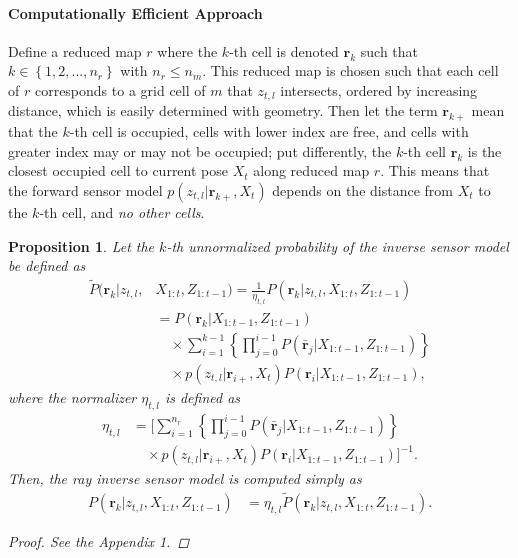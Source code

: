 \documentclass[letterpaper, 10pt, conference]{ieeeconf}
\newcommand{\braces}[1]{\ensuremath{\left\{ #1 \right\}}}
\newtheorem{prop}{Proposition}
\begin{document}
\paragraph{Computationally Efficient Approach}
Define a reduced map $r$ where the $k$-th cell is denoted $\mathbf{r}_k$ such that $k\in\braces{1,2,...,n_r}$ with $n_r\leq n_m$.
This reduced map is chosen such that each cell of $r$ corresponds to a grid cell of $m$ that $z_{t,l}$ intersects, ordered by increasing distance, which is easily determined with geometry.
Then let the term $\mathbf{r}_{k+}$ mean that the $k$-th cell is occupied, cells with lower index are free, and cells with greater index may or may not be occupied; put differently, the $k$-th cell $\mathbf{r}_k$ is the closest occupied cell to current pose $X_t$ along reduced map $r$.
This means that the forward sensor model $p(z_{t,l}|\mathbf{r}_{k+},X_{t})$ depends on the distance from $X_t$ to the $k$-th cell, and \emph{no other cells}.



\begin{prop}
Let the $k$-th unnormalized probability of the inverse sensor model be defined as
\begin{align}
\label{eqn:Unnormalized}
\tilde P(\mathbf{r}_k|z_{t,l},&X_{1:t},Z_{1:t-1})=\frac1{\eta_{t,l}}P(\mathbf{r}_k|z_{t,l},X_{1:t},Z_{1:t-1})\nonumber\\&=P(\mathbf{r}_k|X_{1:t-1},Z_{1:t-1})\nonumber\\
&\quad\times \sum_{i=1}^{k-1}\left\{\prod_{j=0}^{i-1}P(\bar{\mathbf{r}}_j|X_{1:t-1},Z_{1:t-1})\right\}\nonumber\\
&\quad\times p(z_{t,l}|\mathbf{r}_{i+},X_t)P(\mathbf{r}_i|X_{1:t-1},Z_{1:t-1})
,
\end{align}
where the normalizer $\eta_{t,l}$ is defined as
\begin{align}
\label{eqn:allEta}
\eta_{t,l}
&=
\bigg[\sum_{i=1}^{n_r}\left\{\prod_{j=0}^{i-1}P(\bar{\mathbf{r}}_j|X_{1:t-1},Z_{1:t-1})\right\}\nonumber\\&\quad\times p(z_{t,l}|\mathbf{r}_{i+},X_t)P(\mathbf{r}_i|X_{1:t-1},Z_{1:t-1})\bigg]^{-1}.
\end{align}
Then, the ray inverse sensor model is computed simply as
\begin{align}
\label{eqn:RayISMAnswer}
P(\mathbf{r}_k|z_{t,l},X_{1:t},Z_{1:t-1})&=\eta_{t,l}\tilde P(\mathbf{r}_k|z_{t,l},X_{1:t},Z_{1:t-1}).
\end{align}
\begin{proof}
See the Appendix 1.
\end{proof}
\end{prop}
\end{document}
